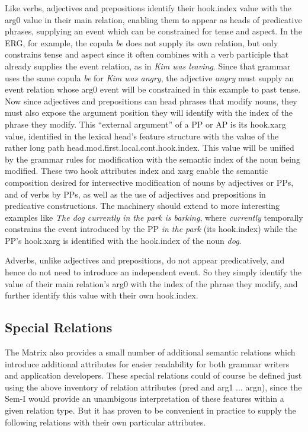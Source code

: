 \documentclass[12pt]{article}
\begin{document}
Like verbs, adjectives and prepositions identify their {\sc hook.index} value 
with the {\sc arg0} value in their main relation, enabling them to appear as
heads of predicative phrases, supplying an event which can be constrained for
tense and aspect.  In the ERG, for example, the copula {\it be} does not
supply its own relation, but only constrains tense and aspect since it often
combines with a verb participle that already supplies the event relation, as 
in {\it Kim was leaving}.  Since that
grammar uses the same copula {\it be} for {\it Kim was angry}, the adjective
{\it angry} must supply an event relation whose {\sc arg0} event will be
constrained in this example to past tense.  Now since adjectives and
prepositions can head phrases that modify nouns, they must also expose the
argument position they will identify with the index of the phrase they
modify.  This ``external argument'' of a PP or AP is its {\sc hook.xarg}
value, identified in the lexical head's feature structure with the value of
the rather long path {\sc head.mod.first.local.cont.hook.index}.  This value
will be unified by the grammar rules for modification with the semantic index 
of the noun being modified.   These two {\sc hook} attributes {\sc index} and
{\sc xarg} enable the semantic composition desired for intersective
modification of nouns by adjectives or PPs, and of verbs by PPs, as well as
the use of adjectives and prepositions in predicative constructions.  The
machinery should extend to more interesting examples like {\it The dog 
currently in the park is barking}, where {\it currently} temporally constrains
the event introduced by the PP {\it in the park} (its {\sc hook.index}) while 
the PP's {\sc hook.xarg} is identified with the {\sc hook.index} of the noun
{\it dog}.

Adverbs, unlike adjectives and prepositions, do not appear predicatively, and
hence do not need to introduce an independent event.  So they simply identify
the value of their main relation's {\sc arg0} with the index of the phrase
they modify, and further identify this value with their own {\sc hook.index}.

\subsection{Special Relations}

The Matrix also provides a small number of additional semantic relations which
introduce additional attributes for easier readability for both grammar
writers and application developers.  These special relations could of course
be defined just using the above inventory of relation attributes ({\sc pred}
and {\sc arg1 ... argn}), since the Sem-I would provide an unambigous
interpretation of these features within a given relation type.  But it has
proven to be convenient in practice to supply the following relations with
their own particular attributes.
\end{document}
